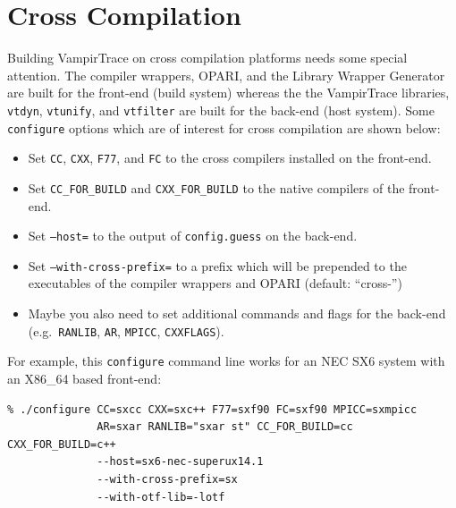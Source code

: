 \documentclass[a4paper,twoside,12pt,BCOR12mm]{scrbook}
\begin{document}
\begin{latexonly}
\begin{description}
\end{description}


\section{Cross Compilation}

Building VampirTrace on cross compilation platforms needs some special attention.
The compiler wrappers, OPARI, and the Library Wrapper Generator are built for the front-end (build system)
whereas the the VampirTrace libraries, \texttt{vtdyn}, \texttt{vtunify}, and \texttt{vtfilter} are built
for the back-end (host system). Some \texttt{configure} options which are of interest for cross compilation
are shown below:
%
\begin{itemize}
\item Set \texttt{CC}, \texttt{CXX}, \texttt{F77}, and \texttt{FC} to the cross compilers installed on the front-end.
\item Set \texttt{CC\_FOR\_BUILD} and \texttt{CXX\_FOR\_BUILD} to the native compilers of the front-end.
\item Set \texttt{--host=} to the output of \texttt{config.guess} on the back-end.
\item Set \texttt{--with-cross-prefix=} to a prefix which will be prepended to the executables of the compiler wrappers and OPARI (default: ``cross-'')
\item Maybe you also need to set additional commands and flags for the back-end (e.g.~\texttt{RANLIB}, \texttt{AR}, \texttt{MPICC}, \texttt{CXXFLAGS}).
\end{itemize}
%
For example, this \texttt{configure} command line works for an NEC SX6 system with an X86\_64 based front-end:
\latex{\begin{small}}
\begin{verbatim}
% ./configure CC=sxcc CXX=sxc++ F77=sxf90 FC=sxf90 MPICC=sxmpicc
              AR=sxar RANLIB="sxar st" CC_FOR_BUILD=cc CXX_FOR_BUILD=c++
              --host=sx6-nec-superux14.1
              --with-cross-prefix=sx
              --with-otf-lib=-lotf
\end{verbatim} 
\latex{\end{small}}



\end{latexonly}
\end{document}
